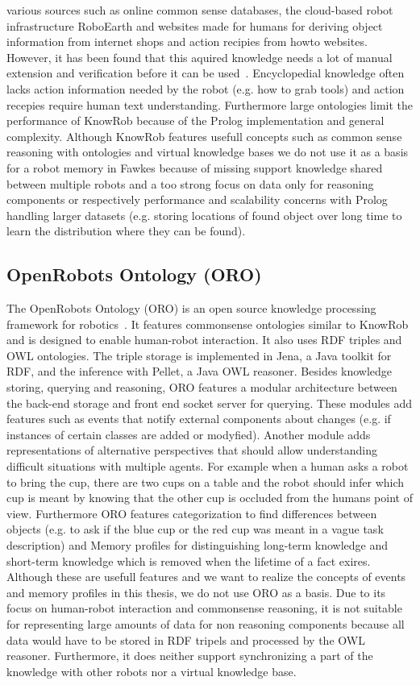 \documentclass[a4paper,11pt]{article}
\begin{document}
various sources such as online common sense databases, the cloud-based
robot infrastructure RoboEarth and websites made for humans for
deriving object information from internet shops and action recipies
from howto websites. However, it has been found that this aquired
knowledge needs a lot of manual extension and verification before it
can be used~\cite{KnowRob-Web}. Encyclopedial knowledge often lacks
action information needed by the robot (e.g. how to grab tools) and
action recepies require human text understanding. Furthermore large
ontologies limit the performance of KnowRob because of the Prolog
implementation and general complexity. Although KnowRob features
usefull concepts such as common sense reasoning with ontologies and
virtual knowledge bases we do not use it as a basis for a robot memory
in Fawkes because of missing support knowledge shared between multiple
robots and a too strong focus on data only for reasoning components or
respectively performance and scalability concerns with Prolog handling
larger datasets (e.g. storing locations of found object over long time
to learn the distribution where they can be found).

\subsection{OpenRobots Ontology (ORO)}
\label{sec:oro}
The OpenRobots Ontology (ORO) is an open source knowledge processing
framework for robotics~\cite{Oro}. It features commonsense ontologies
similar to KnowRob and is designed to enable human-robot
interaction. It also uses RDF triples and OWL ontologies. The triple
storage is implemented in Jena, a Java toolkit for RDF, and the
inference with Pellet, a Java OWL reasoner. Besides knowledge storing,
querying and reasoning, ORO features a modular architecture between
the back-end storage and front end socket server for querying. These
modules add features such as events that notify external components
about changes (e.g. if instances of certain classes are added or
modyfied). Another module adds representations of alternative
perspectives that should allow understanding difficult situations with
multiple agents. For example when a human asks a robot to bring the
cup, there are two cups on a table and the robot should infer which
cup is meant by knowing that the other cup is occluded from the humans
point of view. Furthermore ORO features categorization to find
differences between objects (e.g. to ask if the blue cup or the red
cup was meant in a vague task description) and Memory profiles for
distinguishing long-term knowledge and short-term knowledge which is
removed when the lifetime of a fact exires. Although these are usefull
features and we want to realize the concepts of events and memory
profiles in this thesis, we do not use ORO as a basis. Due to its
focus on human-robot interaction and commonsense reasoning, it is not
suitable for representing large amounts of data for non reasoning
components because all data would have to be stored in RDF tripels and
processed by the OWL reasoner. Furthermore, it does neither support
synchronizing a part of the knowledge with other robots nor a virtual
knowledge base.
\end{document}
